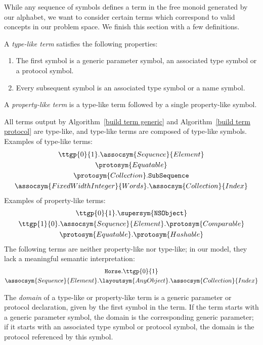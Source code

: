 \documentclass[../generics]{subfiles}
\begin{document}
While any sequence of symbols defines a term in the free monoid generated by our alphabet, we want to consider certain terms which correspond to valid concepts in our problem space. We finish this section with a few definitions.
\begin{definition}
%
%
A \emph{type-like term} satisfies the following properties:
\begin{enumerate}
\item The first symbol is a generic parameter symbol, an associated type symbol or a protocol symbol.
\item Every subsequent symbol is an associated type symbol or a name symbol.
\end{enumerate}
A \emph{property-like term} is a type-like term followed by a single property-like symbol.
\end{definition}
All terms output by Algorithm~\ref{build term generic} and Algorithm~\ref{build term protocol} are type-like, and type-like terms are composed of type-like symbols.  Examples of type-like terms:
\begin{gather*}
\ttgp{0}{1}.\assocsym{Sequence}{Element}\\
\protosym{Equatable}\\
\protosym{Collection}.\texttt{SubSequence}\\
\assocsym{FixedWidthInteger}{Words}.\assocsym{Collection}{Index}
\end{gather*}
Examples of property-like terms:
\begin{gather*}
\ttgp{0}{1}.\supersym{\texttt{NSObject}}\\
\ttgp{1}{0}.\assocsym{Sequence}{Element}.\protosym{Comparable}\\
\protosym{Equatable}.\protosym{Hashable}
\end{gather*}
The following terms are neither property-like nor type-like; in our model, they lack a meaningful semantic interpretation:
\begin{gather*}
\texttt{Horse}.\ttgp{0}{1}\\
\assocsym{Sequence}{Element}.\layoutsym{AnyObject}.\assocsym{Collection}{Index}
\end{gather*}

\begin{definition}
%
The \emph{domain} of a type-like or property-like term is a generic parameter or protocol declaration, given by the first symbol in the term. If the term starts with a generic parameter symbol, the domain is the corresponding generic parameter; if it starts with an associated type symbol or protocol symbol, the domain is the protocol referenced by this symbol.
\end{definition}
\end{document}
